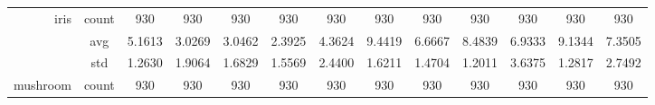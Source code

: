 \begin{table}[htbp]
{\begin{tabular}{rcccccccccccc}
			iris                               & count                                  & 930                                                                                & 930                                                                       & 930                                                                       & 930                                                                       & 930                                           & 930                                         & 930                                            & 930                                            & 930                                            & 930                                            & 930                                            \\
			                                   & avg                                    & 5.1613                                                                             & 3.0269                                                                    & 3.0462                                                                    & \cellcolor[rgb]{ .776,  .937,  .808}\textcolor[rgb]{ 0,  .38,  0}{2.3925} & 4.3624                                        & 9.4419                                      & 6.6667                                         & 8.4839                                         & 6.9333                                         & 9.1344                                         & 7.3505                                         \\
			                                   & std                                    & 1.2630                                                                             & 1.9064                                                                    & 1.6829                                                                    & 1.5569                                                                    & 2.4400                                        & 1.6211                                      & 1.4704                                         & 1.2011                                         & 3.6375                                         & 1.2817                                         & 2.7492                                         \\
			mushroom                           & count                                  & 930                                                                                & 930                                                                       & 930                                                                       & 930                                                                       & 930                                           & 930                                         & 930                                            & 930                                            & 930                                            & 930                                            & 930                                            \\

\end{tabular}}
\end{table}
